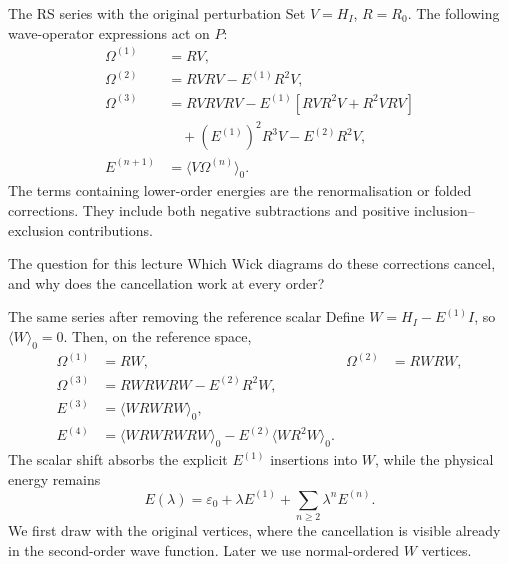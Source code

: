 \documentclass[aspectratio=169,10pt]{beamer}
\newcommand{\av}[1]{\langle #1\rangle_0}
\begin{document}
\begin{frame}{The RS series with the original perturbation}
Set $V=H_I$, $R=R_0$. The following wave-operator expressions act on $P$:
\begin{align*}
\Omega^{(1)}&=RV,\\
\Omega^{(2)}&=RVRV-E^{(1)}R^2V,\\
\Omega^{(3)}&=RVRVRV-E^{(1)}[RVR^2V+R^2VRV]\\
&\quad +(E^{(1)})^2R^3V-E^{(2)}R^2V,\\
E^{(n+1)}&=\av{V\Omega^{(n)}}.
\end{align*}
The terms containing lower-order energies are the renormalisation or folded corrections. They include both negative subtractions and positive inclusion--exclusion contributions.
\begin{block}{The question for this lecture}
Which Wick diagrams do these corrections cancel, and why does the cancellation work at every order?
\end{block}
\end{frame}
\begin{frame}{The same series after removing the reference scalar}
Define $W=H_I-E^{(1)}I$, so $\av W=0$. Then, on the reference space,
\begin{align*}
\Omega^{(1)}&=RW,& \Omega^{(2)}&=RWRW,\\
\Omega^{(3)}&=RWRWRW-E^{(2)}R^2W,\\
E^{(3)}&=\av{WRWRW},\\
E^{(4)}&=\av{WRWRWRW}-E^{(2)}\av{WR^2W}.
\end{align*}
The scalar shift absorbs the explicit $E^{(1)}$ insertions into $W$, while the physical energy remains
\[
 E(\lambda)=\varepsilon_0+\lambda E^{(1)}+\sum_{n\ge2}\lambda^n E^{(n)}.
\]
We first draw with the original vertices, where the cancellation is visible already in the second-order wave function. Later we use normal-ordered $W$ vertices.
\end{frame}
\end{document}

